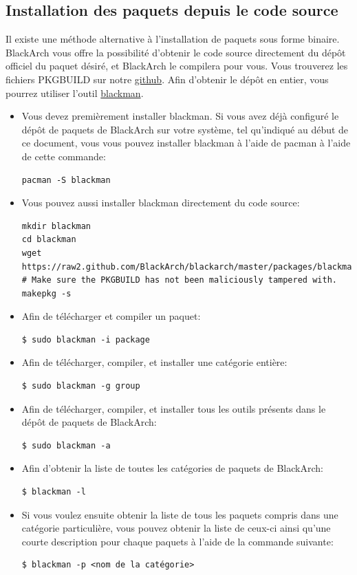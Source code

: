 \documentclass[a4paper, oneside, 11pt]{book}
\begin{document}
\subsection{Installation des paquets depuis le code source}
Il existe une méthode alternative à l'installation de paquets sous forme binaire.
BlackArch vous offre la possibilité d'obtenir le code source directement du 
dépôt officiel du paquet désiré, et BlackArch le compilera pour vous. Vous 
trouverez les fichiers PKGBUILD sur notre 
\href{https://github.com/BlackArch/blackarch/tree/master/packages}{github}. Afin
d'obtenir le dépôt en entier, vous pourrez utiliser l'outil 
\href{https://github.com/BlackArch/blackman}{blackman}.
\begin{itemize} \itemsep10pt
\item Vous devez premièrement installer blackman. Si vous avez déjà configuré
le dépôt de paquets de BlackArch sur votre système, tel qu'indiqué au début de 
ce document, vous vous pouvez installer blackman à l'aide de pacman à l'aide de
cette commande:
{\small
\color{gray}
\begin{verbatim}
pacman -S blackman
\end{verbatim}
}
\item Vous pouvez aussi installer blackman directement du code source:
{\small
\color{gray}
\begin{verbatim}
mkdir blackman
cd blackman
wget https://raw2.github.com/BlackArch/blackarch/master/packages/blackman/PKGBUILD
# Make sure the PKGBUILD has not been maliciously tampered with.
makepkg -s
\end{verbatim}
}
\item Afin de télécharger et compiler un paquet:
{\small
\color{gray}
\begin{verbatim}
$ sudo blackman -i package
\end{verbatim}
}
\item Afin de télécharger, compiler, et installer une catégorie entière:
{\small
\color{gray}
\begin{verbatim}
$ sudo blackman -g group
\end{verbatim}
}
\item Afin de télécharger, compiler, et installer tous les outils présents
dans le dépôt de paquets de BlackArch:
{\small
\color{gray}
\begin{verbatim}
$ sudo blackman -a
\end{verbatim}
}
\item Afin d'obtenir la liste de toutes les catégories de paquets de BlackArch:
{\small
\color{gray}
\begin{verbatim}
$ blackman -l
\end{verbatim}
}
\item Si vous voulez ensuite obtenir la liste de tous les paquets compris dans
une catégorie particulière, vous pouvez obtenir la liste de ceux-ci ainsi qu'une
courte description pour chaque paquets à l'aide de la commande suivante:
{\small
\color{gray}
\begin{verbatim}
$ blackman -p <nom de la catégorie>
\end{verbatim}
}
\end{itemize}
\end{document}
